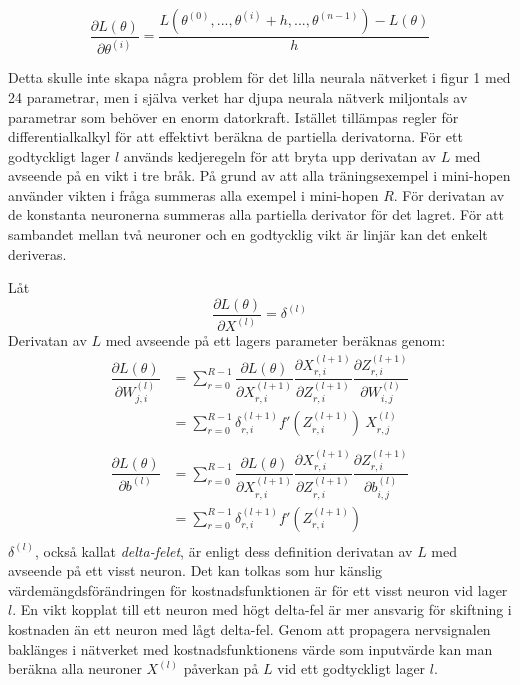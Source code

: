 \documentclass[a4paper,11pt,twoside]{article}
\newcommand*{\pd}[2]{\ensuremath{\dfrac{\partial #1}{\partial #2}}}
\newcommand*{\inpd}[2]{\ensuremath{\frac{\partial #1}{\partial #2}}}
\begin{document}
\begin{equation}
\pd{L(\theta)}{\theta^{(i)}} = \frac{L(\theta^{(0)},...,\theta^{(i)} + h, ..., \theta^{(n-1)})-L(\theta)}{h}
\end{equation}

Detta skulle inte skapa några problem för det lilla neurala nätverket i figur 1 med 24 parametrar, men i själva verket har djupa neurala nätverk miljontals av parametrar som behöver en enorm datorkraft. Istället tillämpas regler för differentialkalkyl för att effektivt beräkna de partiella derivatorna. För ett godtyckligt lager $l$ används kedjeregeln för att bryta upp derivatan av $L$ med avseende på en vikt i tre bråk. På grund av att alla träningsexempel i mini-hopen använder vikten i fråga summeras alla exempel i mini-hopen $R$. För derivatan av de konstanta neuronerna summeras alla partiella derivator för det lagret. För att sambandet mellan två neuroner och en godtycklig vikt är linjär kan det enkelt deriveras. \cite{cs231n}

Låt
\begin{equation}
\inpd{L(\theta)}{X^{(l)}} = \delta^{(l)}
\end{equation}
Derivatan av $L$ med avseende på ett lagers parameter beräknas genom: \cite{cs231n}
\begin{equation}\label{dLdW_FCC}
\begin{split}
\pd{L(\theta)}{W^{(l)}_{j,i}} 
	& = \sum^{R-1}_{r=0} \pd{L(\theta)}{X^{(l+1)}_{r,i}} \pd{X^{(l+1)}_{r,i}}{Z^{(l+1)}_{r,i}} \pd{Z^{(l+1)}_{r,i}}{W^{(l)}_{i,j}} \\
	& = \sum^{R-1}_{r=0} \delta^{(l+1)}_{r,i} f'(Z^{(l+1)}_{r,i}) \ X^{(l)}_{r,j}\\
\end{split}
\end{equation}
\begin{equation}\label{dLdb_FCC}
\begin{split}
\pd{L(\theta)}{b^{(l)}} 
	& = \sum^{R-1}_{r=0} \pd{L(\theta)}{X^{(l+1)}_{r,i}} \pd{X^{(l+1)}_{r,i}}{Z^{(l+1)}_{r,i}} \pd{Z^{(l+1)}_{r,i}}{b^{(l)}_{i,j}} \\
	& = \sum^{R-1}_{r=0} \delta^{(l+1)}_{r,i} f'(Z^{(l+1)}_{r,i}) \\
\end{split}
\end{equation}
$\delta^{(l)}$, också kallat \textit{delta-felet}, är enligt dess definition derivatan av $L$ med avseende på ett visst neuron. Det kan tolkas som hur känslig värdemängdsförändringen för kostnadsfunktionen är för ett visst neuron vid lager $l$. En vikt kopplat till ett neuron med högt delta-fel är mer ansvarig för skiftning i kostnaden än ett neuron med lågt delta-fel. Genom att propagera nervsignalen baklänges i nätverket med kostnadsfunktionens värde som inputvärde kan man beräkna alla neuroner $X^{(l)}$ påverkan på $L$ vid ett godtyckligt lager $l$. \cite{cs231n}
\end{document}
